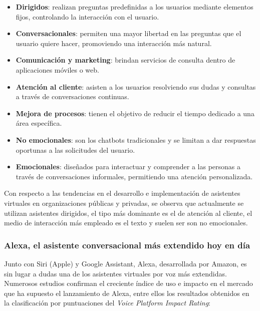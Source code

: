 \begin{itemize}[leftmargin=1.5cm, topsep=2pt, itemsep=1pt]
    \item \textbf{Dirigidos}: realizan preguntas predefinidas a los usuarios mediante elementos fijos, controlando la interacción con el usuario.
    \item \textbf{Conversacionales}: permiten una mayor libertad en las preguntas que el usuario quiere hacer, promoviendo una interacción más natural.
    \item \textbf{Comunicación y marketing}: brindan servicios de consulta dentro de aplicaciones móviles o web.
    \item \textbf{Atención al cliente}: asisten a los usuarios resolviendo sus dudas y consultas a través de conversaciones continuas.
    \item \textbf{Mejora de procesos}: tienen el objetivo de reducir el tiempo dedicado a una área específica.
    \item \textbf{No emocionales}: son los chatbots tradicionales y se limitan a dar respuestas oportunas a las solicitudes del usuario.
    \item \textbf{Emocionales}: diseñados para interactuar y comprender a las personas a través de conversaciones informales, permitiendo una atención personalizada.
\end{itemize}

Con respecto a las tendencias en el desarrollo e implementación de asistentes virtuales en organizaciones públicas y privadas, se observa que actualmente se utilizan asistentes dirigidos, el tipo más dominante es el de atención al cliente, el medio de interacción más empleado es el texto y suelen ser son no emocionales.

\subsubsection{Alexa, el asistente conversacional más extendido hoy en día}

Junto con Siri (Apple) y Google Assistant, Alexa, desarrollada por Amazon, es sin lugar a dudas una de los asistentes virtuales por voz más extendidas. Numerosos estudios confirman el creciente índice de uso e impacto en el mercado que ha supuesto el lanzamiento de Alexa, entre ellos los resultados obtenidos en la clasificación por puntuaciones del \textit{Voice Platform Impact Rating}:


